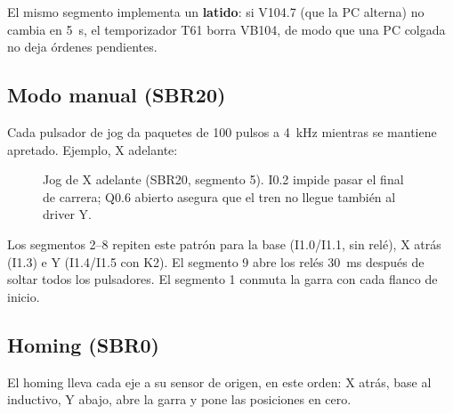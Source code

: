 \documentclass[a4paper,11pt]{article}
\begin{document}
El mismo segmento implementa un \textbf{latido}: si V104.7 (que la PC alterna) no cambia en 5~s, el temporizador T61 borra VB104, de modo que una PC colgada no deja órdenes pendientes.

\subsection{Modo manual (SBR20)}
Cada pulsador de jog da paquetes de 100 pulsos a 4~kHz mientras se mantiene apretado. Ejemplo, X adelante:

\begin{figure}[H]
\centering
{}
\caption{Jog de X adelante (SBR20, segmento 5). I0.2 impide pasar el final de carrera; Q0.6 abierto asegura que el tren no llegue también al driver Y.}
\end{figure}

Los segmentos 2--8 repiten este patrón para la base (I1.0/I1.1, sin relé), X atrás (I1.3) e Y (I1.4/I1.5 con K2). El segmento 9 abre los relés 30~ms después de soltar todos los pulsadores. El segmento 1 conmuta la garra con cada flanco de inicio.

\subsection{Homing (SBR0)}
El homing lleva cada eje a su sensor de origen, en este orden: X atrás, base al inductivo, Y abajo, abre la garra y pone las posiciones en cero.
\end{document}
